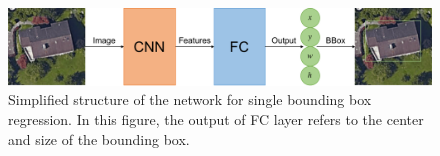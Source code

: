 \begin{figure}[!h]
	\centering
	\includegraphics[width=\fig\textwidth]{3-06.pdf}
    \caption[Simplified structure of the network for single bounding box regression]{Simplified structure of the network for single bounding box regression. In this figure, the output of FC layer refers to the center and size of the bounding box.}
    \label{fig:sglbboxreg}
\end{figure}